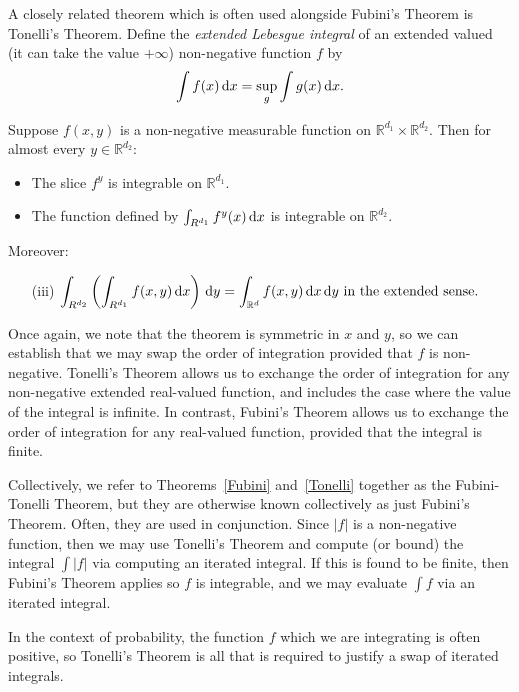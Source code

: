 A closely related theorem which is often used alongside Fubini's Theorem is Tonelli's Theorem. Define the \emph{extended Lebesgue integral} of an extended valued (it can take the value \(+\infty\)) non-negative function \(f\) by 
\[\int f(x)\, \mathrm{d} x = \sup_{g}\int g(x)\, \mathrm{d} x.\]
\begin{thm}\label{Tonelli}
	Suppose \(f(x,y)\) is a non-negative measurable function on \(\mathbb R^{d_1}\times \mathbb R^{d_2}\). Then for almost every \(y\in\mathbb R^{d_2}\):
	\begin{itemize}
		\item The slice \(f^y\) is integrable on \(\mathbb R^{d_1}\).
		\item The function defined by \(\int_{R^{d_1}} f^y(x)\, \mathrm{d} x\) is integrable on \(\mathbb R^{d_2}\). 
	\end{itemize}
	Moreover:
	\begin{itemize}
		\item[(iii)] \(\displaystyle\int_{R^{d_2}}\left(\int_{R^{d_1}}f(x,y)\, \mathrm{d} x\right)\, \mathrm{d} y = \int_{\mathbb R^d}f(x,y)\, \mathrm{d} x\, \mathrm{d} y \mbox{ in the extended sense}.\)
	\end{itemize}
\end{thm}

Once again, we note that the theorem is symmetric in \(x\) and \(y\), so we can establish that we may swap the order of integration provided that \(f\) is non-negative. Tonelli's Theorem allows us to exchange the order of integration for any non-negative extended real-valued function, and includes the case where the value of the integral is infinite. In contrast, Fubini's Theorem allows us to exchange the order of integration for any real-valued function, provided that the integral is finite. 

Collectively, we refer to Theorems~\ref{Fubini} and~\ref{Tonelli} together as the Fubini-Tonelli Theorem, but they are otherwise known collectively as just Fubini's Theorem. Often, they are used in conjunction. Since \(|f|\) is a non-negative function, then we may use Tonelli's Theorem and compute (or bound) the integral \(\int |f|\) via computing an iterated integral. If this is found to be finite, then Fubini's Theorem applies so \(f\) is integrable, and we may evaluate \(\int f\) via an iterated integral. 

In the context of probability, the function \(f\) which we are integrating is often positive, so Tonelli's Theorem is all that is required to justify a swap of iterated integrals. 

